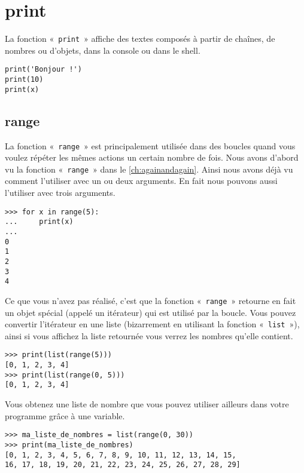 \section*{print}
La fonction « \texttt{print} » affiche des textes composés à partir de chaînes, de nombres ou d'objets, dans la console ou dans le shell. 
\begin{Verbatim}[frame=single,rulecolor=\color{gray}]
print('Bonjour !')
print(10)
print(x)
\end{Verbatim}

\subsection*{range}

La fonction « \texttt{range} » est principalement utilisée dans des boucles quand vous voulez répéter les mêmes actions un certain nombre de fois.  Nous avons d'abord vu la fonction « \texttt{range} » dans le \autoref{ch:againandagain}. Ainsi nous avons déjà vu comment l'utiliser avec un ou deux arguments. En fait nous pouvons aussi l'utiliser avec trois arguments.

\begin{Verbatim}[frame=single,rulecolor=\color{gray}]
>>> for x in range(5):
...     print(x)
... 
0
1
2
3
4
\end{Verbatim}

Ce que vous n'avez pas réalisé, c'est que la fonction « \texttt{range} » retourne en fait un objet spécial (appelé un itérateur) qui est utilisé par la boucle. Vous pouvez convertir l'itérateur en une liste (bizarrement en utilisant la fonction « \texttt{list} »), ainsi si vous affichez la liste retournée vous verrez les nombres qu'elle contient.  

\begin{Verbatim}[frame=single,rulecolor=\color{gray}]
>>> print(list(range(5)))
[0, 1, 2, 3, 4]
>>> print(list(range(0, 5)))
[0, 1, 2, 3, 4]
\end{Verbatim}

Vous obtenez une liste de nombre que vous pouvez utiliser ailleurs dans votre programme grâce à une variable.

\begin{Verbatim}[frame=single,rulecolor=\color{gray}]
>>> ma_liste_de_nombres = list(range(0, 30))
>>> print(ma_liste_de_nombres)
[0, 1, 2, 3, 4, 5, 6, 7, 8, 9, 10, 11, 12, 13, 14, 15, 
16, 17, 18, 19, 20, 21, 22, 23, 24, 25, 26, 27, 28, 29]
\end{Verbatim}

